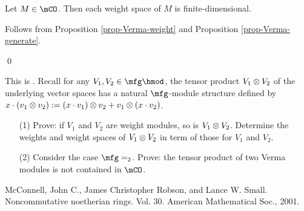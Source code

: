 \begin{cor}
	Let $M\in \mCO$. Then each weight space of $M$ is finite-dimensional.
\end{cor}

\proof
	Follows from Proposition \ref{prop-Verma-weight} and Proposition \ref{prop-Verma-generate}.

\qed

\begin{exe}
	This is . Recall for any $V_1,V_2\in \mfg\hmod$, the tensor product $V_1\ot V_2$ of the underlying vector spaces has a natural $\mfg$-module structure defined by $x\cdot (v_1\ot v_2):= (x\cdot v_1)\ot v_2 + v_1\ot(x\cdot v_2)$. 

	\begin{itemize}
		\item[(1)]
			Prove: if $V_1$ and $V_2$ are weight modules, so is $V_1\ot V_2$. Determine the weights and weight spaces of $V_1\ot V_2$ in term of those for $V_1$ and $V_2$.
		\item[(2)]
			Consider the case $\mfg=\sl_2$. Prove: the tensor product of two Verma modules is not contained in $\mCO$.
	\end{itemize}

\end{exe}




\begin{thebibliography}{Yau}



 McConnell, John C., James Christopher Robson, and Lance W. Small. Noncommutative noetherian rings. Vol. 30. American Mathematical Soc., 2001.

\end{thebibliography}

 


